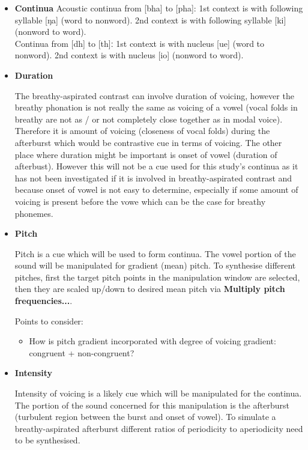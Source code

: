 \documentclass[12pt, english]{article}
\begin{document}
\begin{itemize}
    Participants are going to be tested online using Zoom online meetings, and recruited through author's contacts, and likely by reaching out to Assam/Northeast related online forums like on reddit. The plan is to have non-native English speakers ideally all from Guwahati with same L1, this is to neutralise individual factors like regional variation, exposure to English. A different experiment setup can be by using a qualtrics form along with online meet, so the participants have more autonomy with the test and excess to stimuli on their device while also making it easier to see if they are in a quiet environment. \par
    \item \textbf{Continua}
    Acoustic continua from [bha] to [pha]: 1st context is with following syllable [ŋa] (word to nonword). 2nd context is with following syllable [ki] (nonword to word). \\
    Continua from [dh] to [th]ː 1st context is with nucleus [ue] (word to nonword). 2nd context is with nucleus [io] (nonword to word). \par
    \item \textbf{Duration} \par
    The breathy-aspirated contrast can involve duration of voicing, however the breathy phonation is not really the same as voicing of a vowel (vocal folds in breathy are not as / or not completely close together as in modal voice). Therefore it is amount of voicing (closeness of vocal folds) during the afterburst which would be contrastive cue in terms of voicing. The other place where duration might be important is onset of vowel (duration of afterbust). However this will not be a cue used for this study's continua as it has not been investigated if it is involved in breathy-aspirated contrast and because onset of vowel is not easy to determine, especially if some amount of voicing is present before the vowe which can be the case for breathy phonemes.  \par
    \item \textbf{Pitch} \par
    Pitch is a cue which will be used to form continua. The vowel portion of the sound will be manipulated for gradient (mean) pitch. To synthesise different pitches, first the target pitch points in the manipulation window are selected, then they are scaled up/down to desired mean pitch via \textbf{Multiply pitch frequencies...}. \par
    Points to consider:
    \begin{itemize}
        \item How is pitch gradient incorporated with degree of voicing gradient: congruent + non-congruent?
    \end{itemize}
    \item \textbf{Intensity} \par
    Intensity of voicing is a likely cue which will be manipulated for the continua. The portion of the sound concerned for this manipulation is the afterburst (turbulent region between the burst and onset of vowel). To simulate a breathy-aspirated afterburst different ratios of periodicity to aperiodicity need to be synthesised. 
\end{itemize}

\end{document}
